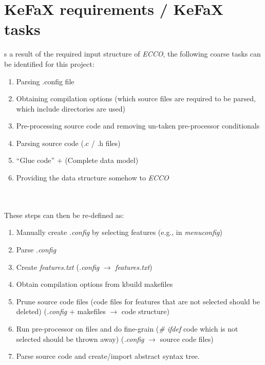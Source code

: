 \section{KeFaX requirements / KeFaX tasks}
s a result of the required input structure of {\it ECCO}, 
the following coarse tasks can be identified for this project:
\begin{enumerate}
 \item Parsing .config file
 \item Obtaining compilation options (which source files are required to be 
 parsed, which include directories are used)
 \item Pre-processing source code and removing un-taken 
 pre-processor conditionals
 \item Parsing source code (.c / .h files)
 \item ``Glue code'' $+$ (Complete data model)
 \item Providing the data structure somehow to {\it ECCO}
\end{enumerate}
\ \\
\ \\
These steps can then be re-defined as:
\begin{enumerate}
 \item\label{reqTaskFeatureCreate} Manually create {\it .config} by selecting features 
 (e.g., in {\it menuconfig})
 \item\label{reqTaskParseDotConfig} Parse {\it .config}
 \item\label{reqTaskFeatureTxtCreate} Create {\it features.txt}
 ({\it .config} $\rightarrow$ {\it features.txt})
 \item\label{reqTaskCompileOptions} Obtain compilation options from kbuild makefiles
 \item\label{reqTaskPruneSource} Prune source code files
 (code files for features that are not selected should be deleted)
 ({\it .config} $+$ makefiles $\rightarrow$ code structure)
 \item\label{reqTaskPreprocess} Run pre-processor on files and do fine-grain
 ({\it \# ifdef} code which is not selected should be thrown away)
 ({\it .config} $\rightarrow$ source code files)
 \item\label{reqTaskParse} Parse source code and create/import 
 abstract syntax tree.
\end{enumerate}

